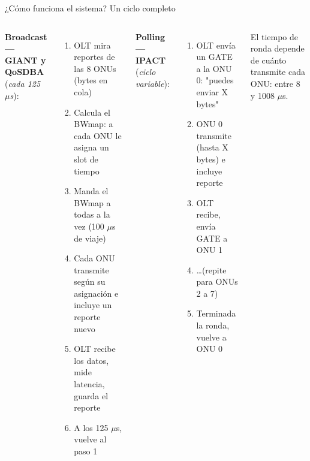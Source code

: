 \documentclass[aspectratio=169,t]{beamer}
\begin{document}
\begin{frame}{¿Cómo funciona el sistema? Un ciclo completo}
    \begin{columns}[t]
        \textbf{Broadcast — GIANT y QoSDBA} (\textit{cada 125 $\mu$s}):
        \begin{enumerate}\footnotesize
            \item OLT mira reportes de las 8 ONUs (bytes en cola)
            \item Calcula el BWmap: a cada ONU le asigna un slot de tiempo
            \item Manda el BWmap a todas a la vez (100 $\mu$s de viaje)
            \item Cada ONU transmite según su asignación e incluye un reporte nuevo
            \item OLT recibe los datos, mide latencia, guarda el reporte
            \item A los 125 $\mu$s, vuelve al paso 1
        \end{enumerate}
        \textbf{Polling — IPACT} (\textit{ciclo variable}):
        \begin{enumerate}\footnotesize
            \item OLT envía un GATE a la ONU 0: "puedes enviar X bytes"
            \item ONU 0 transmite (hasta X bytes) e incluye reporte
            \item OLT recibe, envía GATE a ONU 1
            \item \ldots (repite para ONUs 2 a 7)
            \item Terminada la ronda, vuelve a ONU 0
        \end{enumerate}
        \vspace{0.15cm}
        \footnotesize El tiempo de ronda depende de cuánto transmite cada ONU: entre 8 y 1008 $\mu$s.
    \end{columns}
\end{frame}
\end{document}

